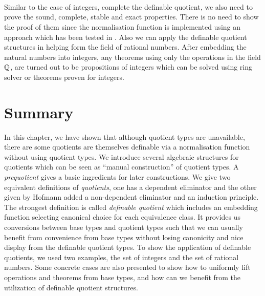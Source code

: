\begin{code}
\\
\> \AgdaSymbol{:}   \<%
\\
\>   \AgdaSymbol{=} \AgdaSymbol{(} \AgdaSymbol{(} \AgdaSymbol{))}  \AgdaSymbol{(} \AgdaSymbol{)}\<%
\\
\end{code}

Similar to the case of integers, complete the definable quotient, we
also need to prove the sound, complete, stable and exact
properties. There is no need to show the proof of them since the
normalisation function is implemented using an approach which has been
tested in \maths.
Also we can apply the definable quotient structures in helping form
the field of rational numbers. After embedding the natural numbers
into integers, any theorems using only the operations in the field
$\mathbb{Q}$, are turned out to be propositions of integers which can be
solved using ring solver or theorems proven for integers.



\section{Summary}

In this chapter, we have shown that 
although quotient
types are unavailable, there are some quotients are
themselves definable via a normalisation function without using quotient types. We introduce several
algebraic structures for quotients which can be seen as ``manual construction'' of quotient types.
A \emph{prequotient} gives a basic ingredients for later
constructions. We give two equivalent definitions of \emph{quotients},
one has a dependent eliminator and the other given by Hofmann added
 a non-dependent eliminator  and an induction principle.
The strongest definition is called \emph{definable quotient} which includes an embedding function selecting canonical choice for each
equivalence class. It provides us conversions between base types and
quotient types such that we can usually benefit from convenience from base types without losing canonicity and nice display from the
definable quotient types. To show the application of definable quotients, we
used two examples, the set of integers and the set of rational
numbers. Some concrete cases are also presented to show how to
uniformly lift operations and theorems from base types, and how can we
benefit from the utilization of definable quotient structures.





